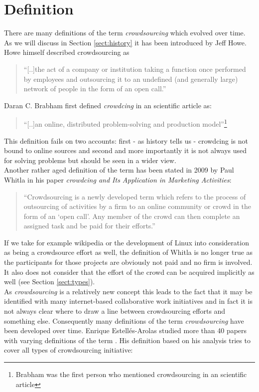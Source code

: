\documentclass{acm_proc_article-sp}
\begin{document}
  \section{Definition}
  There are many definitions of the term \textit{crowdsourcing} which evolved over time. \\
  As we will discuss in Section \ref{sect:history} it has been introduced by Jeff Howe\cite{howe:rise}. Howe himself described crowdsourcing as
  \begin{quote}
    ``[..]the act of a company or institution taking a function once performed by employees and outsourcing it to an undefined (and generally large) network of people in the form of an open call.''
  \end{quote}
  Daran C. Brabham first defined \textit{crowdcing} in an scientific article \cite{brabham:crowd1} as:
  \begin{quote}
    ``[..]an online, distributed problem-solving and production model''\footnote{Brabham was the first person who mentioned crowdsourcing in an scientific article}
  \end{quote}
  This definition fails on two accounts: first - as history tells us - crowdcing is not bound to online sources and second and more importantly it is not always used for solving problems but should be seen in a wider view.\\
  Another rather aged definition of the term has been stated in 2009 by Paul Whitla in his paper \textit{crowdcing and Its Application in Marketing Activities}\cite{whitla:crowd}:
  \begin{quote}
    ``Crowdsourcing is a newly developed term which refers to the process of outsourcing of activities by a firm to an online community or crowd in the form of an ‘open call’. Any member of the crowd can then complete an assigned task and be paid for their efforts.''
  \end{quote}
  If we take for example wikipedia or the development of Linux into consideration as being a crowdsource effort as well, the definition of Whitla is no longer true as the participants for those projects are obviously not paid and no firm is involved. It also does not consider that the effort of the crowd can be acquired implicitly as well (see Section \ref{sect:types}).\\
  As \textit{crowdsourcing} is a relatively new concept this leads to the fact that it may be identified with many internet-based collaborative work initiatives and in fact it is not always clear where to draw a line between crowdsourcing efforts and something else. Consequently many definitions of the term \textit{crowdsourcing} have been developed over time. Enrique Estellés-Arolas studied more than 40 papers with varying definitions of the term \cite{arolas:definition}. His definition based on his analysis tries to cover all types of crowdsourcing initiative:
\end{document}
